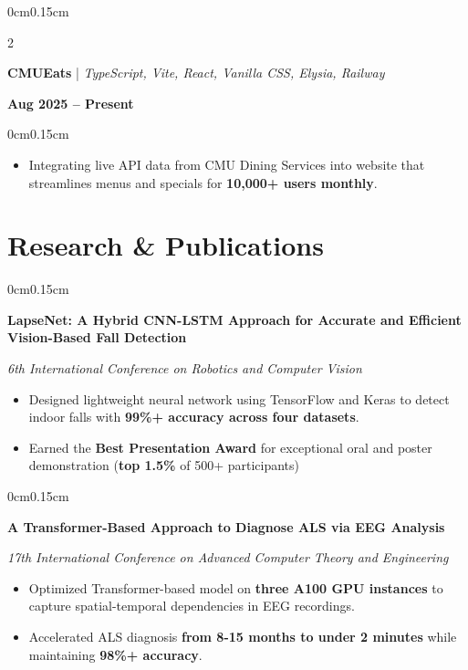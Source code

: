\documentclass[10pt, letterpaper]{article}
\newenvironment{highlights}{
    \begin{itemize}[topsep=0pt, parsep=0pt, partopsep=0pt, itemsep=0pt, leftmargin=0.6cm]
}{
    \end{itemize}
}
\newenvironment{onecolentry}{
    \begin{adjustwidth}{0cm}{0.15cm}
}{
    \end{adjustwidth}
}
\newenvironment{twocolentry}[2][]{
    \onecolentry
    \def\secondColumn{#2}
    \setcolumnwidth{\fill, 4cm}
    \begin{paracol}{2}
}{
    \switchcolumn \raggedleft \secondColumn
    \end{paracol}
    \endonecolentry
}
\begin{document}
    \vspace{0.05cm}

    \begin{twocolentry}{\textbf{Aug 2025 -- Present}}
        \textbf{CMUEats} | \textit{TypeScript, Vite, React, Vanilla CSS, Elysia, Railway}
    \end{twocolentry}
    \vspace{-0.1cm}
    \begin{onecolentry}
        \begin{highlights}
            \item Integrating live API data from CMU Dining Services into website that streamlines menus and specials for \textbf{10,000+ users monthly}.
        \end{highlights}
    \end{onecolentry}

    \vspace{0.05cm}
    \section{Research \& Publications}
    \vspace{0.1cm}

    \begin{onecolentry}
        \textbf{LapseNet: A Hybrid CNN-LSTM Approach for Accurate and Efficient Vision-Based Fall Detection}
        
        \textit{6th International Conference on Robotics and Computer Vision}
        \begin{highlights}
            \item Designed lightweight neural network using TensorFlow and Keras to detect indoor falls with \textbf{99\%+ accuracy across four datasets}.
            \item Earned the \textbf{Best Presentation Award} for exceptional oral and poster demonstration (\textbf{top 1.5\%} of 500+ participants)
        \end{highlights}
    \end{onecolentry}

    \vspace{0.05cm}

    \begin{onecolentry}
        \textbf{A Transformer-Based Approach to Diagnose ALS via EEG Analysis}
        
        \textit{17th International Conference on Advanced Computer Theory and Engineering}
        \begin{highlights}
            \item Optimized Transformer-based model on \textbf{three A100 GPU instances} to capture spatial-temporal dependencies in EEG recordings.
            \item Accelerated ALS diagnosis \textbf{from 8-15 months to under 2 minutes} while maintaining \textbf{98\%+ accuracy}.
        \end{highlights}
    \end{onecolentry}
\end{document}
